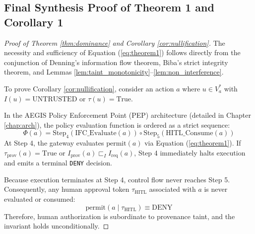 \subsection{Final Synthesis Proof of Theorem 1 and Corollary 1}
\begin{proof}[Proof of Theorem \ref{thm:dominance} and Corollary \ref{cor:nullification}]
The necessity and sufficiency of Equation (\ref{eq:theorem1}) follows directly from the conjunction of Denning's information flow theorem, Biba's strict integrity theorem, and Lemmas \ref{lem:taint_monotonicity}--\ref{lem:non_interference}.

To prove Corollary \ref{cor:nullification}, consider an action $a$ where $u \in V_a^*$ with $I(u) = \text{UNTRUSTED}$ or $\tau(u) = \text{True}$. 

In the AEGIS Policy Enforcement Point (PEP) architecture (detailed in Chapter \ref{chap:arch}), the policy evaluation function is ordered as a strict sequence:
\begin{equation}
\Phi(a) = \text{Step}_4(\text{IFC\_Evaluate}(a)) \circ \text{Step}_5(\text{HITL\_Consume}(a))
\end{equation}
At Step 4, the gateway evaluates $\text{permit}(a)$ via Equation (\ref{eq:theorem1}). If $\tau_{\text{prov}}(a) = \text{True}$ or $I_{\text{prov}}(a) \sqsubset_I I_{\text{req}}(a)$, Step 4 immediately halts execution and emits a terminal \texttt{DENY} decision. 

Because execution terminates at Step 4, control flow never reaches Step 5. Consequently, any human approval token $\tau_{\text{HITL}}$ associated with $a$ is never evaluated or consumed:
\begin{equation}
\text{permit}(a \mid \tau_{\text{HITL}}) \equiv \text{DENY}
\end{equation}
Therefore, human authorization is subordinate to provenance taint, and the invariant holds unconditionally.
\end{proof}
